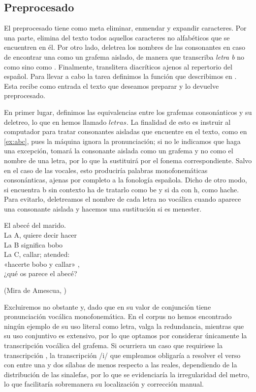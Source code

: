 \subsection{Preprocesado}\label{met:letters}
El preprocesado tiene como meta eliminar, enmendar y expandir caracteres. Por una parte, elimina del texto todos aquellos caracteres no alfabéticos que se encuentren en él. Por otro lado, deletrea los nombres de las consonantes en caso de encontrar una como un grafema aislado, de manera que transcriba \textit{letra b} no como  sino como . Finalmente, translitera diacríticos ajenos al repertorio del español. Para llevar a cabo la tarea definimos la función que describimos en . Esta recibe como entrada el texto que deseamos preparar y lo devuelve preprocesado.

En primer lugar, definimos las equivalencias entre los grafemas consonánticos y su deletreo, lo que en  hemos llamado $letras$. La finalidad de esto es instruir al computador para tratar consonantes aisladas que encuentre en el texto, como en \ref{ex:abc}, pues la máquina ignora la pronunciación; si no le indicamos que haga una excepción, tomará la consonante aislada como un grafema y no como el nombre de una letra, por lo que la sustituirá por el fonema correspondiente. Salvo en el caso de las vocales, esto produciría palabras monofonemáticas consonánticas, ajenas por completo a la fonología española. Dicho de otro modo, si encuentra \textlangle{}b\textrangle{} sin contexto ha de tratarlo como \textlangle{}be\textrangle{} y si da con \textlangle{}h\textrangle{}, como \textlangle{}hache\textrangle{}. Para evitarlo, deletreamos el nombre de cada letra no vocálica cuando aparece una consonante aislada y hacemos una sustitución si es menester.

\begin{exe}
	\ex	\label{ex:abc}
	El abecé del marido.\\
	La A, quiere decir hacer\\
	La B significa bobo\\
	La C, callar; atended:\\
	«hacerte bobo y callar» ,\\
	¿qué os parece el abecé?\\\strut\hfill(Mira de Amescua, )
\end{exe}

Excluiremos no obstante \textlangle{}y\textrangle{}, dado que en su valor de conjunción tiene pronunciación vocálica monofonemática. En el corpus no hemos encontrado ningún ejemplo de su uso literal como letra, valga la redundancia, mientras que su uso conjuntivo es extensivo, por lo que optamos por considerar únicamente la transcripción vocálica del grafema. Si ocurriera un caso que requiriese la transcripción , la transcripción /i/ que empleamos obligaría a resolver el verso con entre una y dos sílabas de menos respecto a las reales, dependiendo de la distribución de las sinalefas, por lo que se evidenciaría la irregularidad del metro, lo que facilitaría sobremanera su localización y corrección manual.

